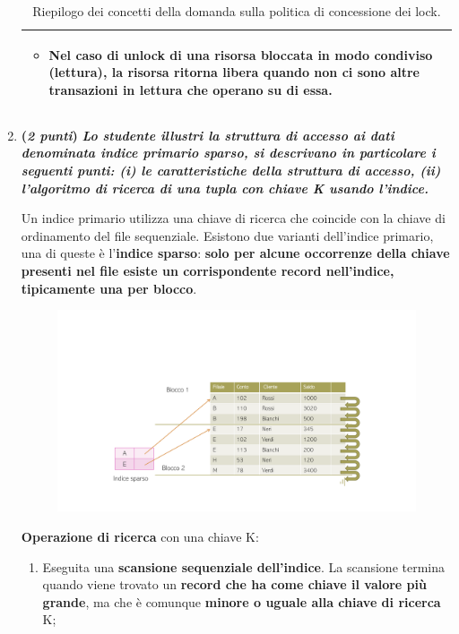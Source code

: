 \documentclass[a4paper]{article}
\begin{document}
\begin{enumerate}
\begin{table}[!htp]
\begin{tabular}{@{} l p{21em} @{}}
\begin{itemize}
					\item Nel caso di \textsf{unlock} di una \textbf{risorsa bloccata} in modo condiviso (lettura), la \textbf{risorsa ritorna libera quando non ci sono altre transazioni in lettura che operano su di essa}.
				\end{itemize} \\
				\bottomrule
			\end{tabular}
			\caption{Riepilogo dei concetti della domanda sulla politica di concessione dei lock.}
		\end{table}\newpage
		
		\item \textbf{(\emph{2 punti})} \textcolor{Green4}{\textbf{\emph{Lo studente illustri la struttura di accesso ai dati denominata indice primario sparso, si descrivano in particolare i seguenti punti: (i) le caratteristiche della struttura di accesso, (ii) l'algoritmo di ricerca di una tupla con chiave K usando l'indice.}}}\label{dom: indice primario sparso}
		
		Un indice primario utilizza una chiave di ricerca che coincide con la chiave di ordinamento del file sequenziale. Esistono due varianti dell'indice primario, una di queste è l'\textbf{indice sparso}: \textbf{solo per alcune occorrenze della chiave presenti nel file esiste un corrispondente record nell'indice, tipicamente una per blocco}.
		\begin{figure}[!htp]
			\centering
			\includegraphics[width=\textwidth]{img/ex/indice-sparso-1.pdf}
		\end{figure}
		
		\noindent
		\textbf{Operazione di ricerca} con una chiave K:
		\begin{enumerate}
			\item Eseguita una \textbf{scansione sequenziale dell'indice}. La scansione termina quando viene trovato un \textbf{record che ha come chiave il valore più grande}, ma che è comunque \textbf{minore o uguale alla chiave di ricerca} K;
			

\end{enumerate}
\end{enumerate}
\end{document}
